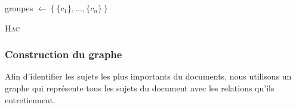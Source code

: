         \begin{algorithm}
          \DontPrintSemicolon{}

          \BlankLine

          groupes $\leftarrow \left\{\{c_1\}, \dots, \{c_n\}\right\}$\;

          \caption{\textsc{Hac}
                   \label{algo:hac}}
        \end{algorithm}


      \subsubsection{Construction du graphe}
      \label{subsubsec:main:domain_independent_keyphrase_extraction-unsupervised_automatic_keyphrase_extraction-topicrank-graph_construction}
        Afin d'identifier les sujets les plus importants du documents, nous
        utilisons un graphe qui représente tous les sujets du document avec les
        relations qu'ils entretiennent.

